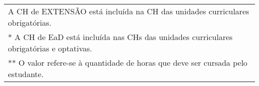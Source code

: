 \begin{quadro}[ht!]
\begin{tabular}{| l | l |}
\multicolumn{2}{l}{\footnotesize * A CH de EXTENSÃO está incluída na CH das unidades curriculares obrigatórias.}\\
\multicolumn{2}{l}{\footnotesize ** A CH de EaD está incluída nas CHs das unidades curriculares obrigatórias e optativas.}\\
\multicolumn{2}{l}{\footnotesize *** O valor refere-se à quantidade de horas que deve ser cursada pelo estudante.}
\end{tabular}
\label{quad:distr}
\end{quadro}

